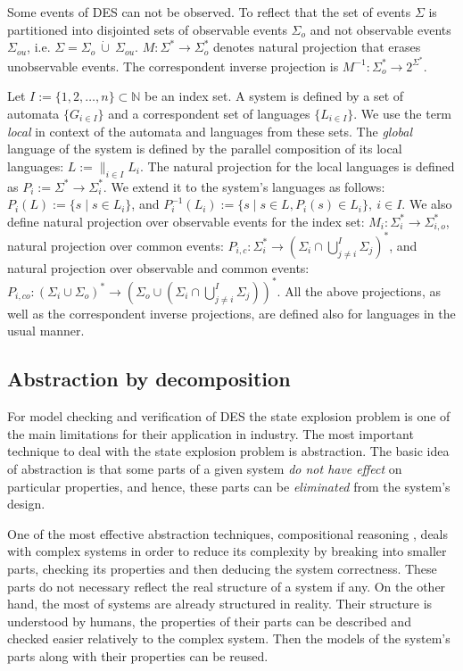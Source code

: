 Some events of DES can not be observed. To reflect that the set of events
$\Sigma$ is partitioned into disjointed sets of observable events $\Sigma_o$ and
not observable events $\Sigma_{ou}$, i.e. $\Sigma = \Sigma_o~\dot{\cup}~
\Sigma_{ou}$.
$M: \Sigma^* \rightarrow \Sigma_o^*$ denotes natural projection that
erases unobservable events.
The correspondent inverse projection is $M^{-1}: \Sigma_o^* \rightarrow
2^{\Sigma^*}$.

Let $I := \{1,2,\ldots,n\} \subset  \mathbb{N}$ be an index set. A system is
defined by a set of automata $\{G_{i \in I}\}$ and a correspondent set of
languages $\{L_{i \in I}\}$. We use the term \emph{local} in context of the
automata and languages from these sets. The \emph{global} language of the system
is defined by the parallel composition \cite{cassandras_introduction_2010} of
its local languages:
$L := \parallel_{i \in I} L_i$.
The natural projection for the local languages is defined as 
$P_i := \Sigma^* \rightarrow \Sigma_i^*$. We extend it to the system's languages
as follows: $P_i(L) := \{s\mid s\in L_{i}\}$, and 
$P_i^{-1}(L_{i}) := \{s \mid s \in L, P_i(s) \in L_i\}, ~i \in I$.
We also define natural projection over observable events for the index set: 
$M_i :\Sigma_i^* \rightarrow \Sigma_{i,o}^*$, natural projection over common
events:
$P_{i,c} : \Sigma_i^* \rightarrow (\Sigma_i \cap \bigcup_{j\neq
i}^I\Sigma_j)^*$, and natural projection over observable and common events:
$P_{i,co} : (\Sigma_i \cup \Sigma_o)^* \rightarrow (\Sigma_{o} \cup (\Sigma_i
\cap \bigcup_{j\neq i}^I\Sigma_j))^*$. All the above projections, as well as
the correspondent inverse projections, are defined also for languages in the
usual manner.


\subsection{Abstraction by decomposition}

For model checking and verification of DES the state explosion problem is one of
the main limitations for their application in industry. The most important
technique to deal with the state explosion problem is abstraction. The basic
idea of abstraction is that some parts of a given system \emph{do not have
effect} on particular properties, and hence, these parts can be
\emph{eliminated} from the system's design.

One of the most effective abstraction techniques, compositional reasoning
\cite{berezin_compositional_1998}, deals with complex systems in order to reduce
its complexity by breaking into smaller parts, checking its properties and then
deducing the system correctness. These parts do not necessary reflect the real
structure of a system if any. On the other hand, the most of systems are
already structured in reality. Their structure is understood by humans, the
properties of their parts can be described and checked easier relatively to the
complex system. Then the models of the system's parts along with their
properties can be reused.

